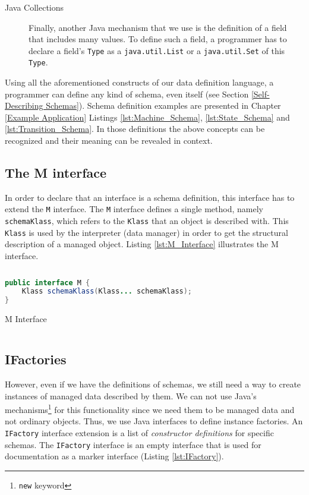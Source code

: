 \begin{description}
	\item [Java Collections] Finally, another Java mechanism that we use is the definition of a field that includes many values.
	To define such a field, a programmer has to declare a field's \texttt{Type} as a \texttt{java.util.List} or a \texttt{java.util.Set} of this \texttt{Type}.

\end{description}

Using all the aforementioned constructs of our data definition language, a programmer can define any kind of schema, even itself (see Section \ref{Self-Describing Schemas}).
Schema definition examples are presented in Chapter \ref{Example Application} Listings \ref{lst:Machine_Schema}, \ref{lst:State_Schema} and \ref{lst:Transition_Schema}.
In those definitions the above concepts can be recognized and their meaning can be revealed in context.

\subsection{The M interface}\label{M}
In order to declare that an interface is a schema definition, this interface has to extend the \texttt{M} interface.
The \texttt{M} interface defines a single method, namely \texttt{schemaKlass}, which refers to the \texttt{Klass} that an object is described with.
This \texttt{Klass} is used by the interpreter (data manager) in order to get the structural description of a managed object. 
Listing \ref{lst:M_Interface} illustrates the M interface.

\begin{sourcecode} [H]
	\begin{lstlisting}[language=Java, escapechar=|]
public interface M {
	Klass schemaKlass(Klass... schemaKlass);
}
	\end{lstlisting}
	\caption{M Interface}
	\label{lst:M_Interface}
\end{sourcecode}

\subsection{IFactories}\label{IFactories}
However, even if we have the definitions of schemas, we still need a way to create instances of managed data described by them.
We can not use Java's mechanisms\footnote{\texttt{new} keyword} for this functionality since we need them to be managed data and not ordinary objects.
Thus, we use Java interfaces to define instance factories.
An \texttt{IFactory} interface extension is a list of \textit{constructor definitions} for specific schemas.
The \texttt{IFactory} interface is an empty interface that is used for documentation as a marker interface (Listing \ref{lst:IFactory}).

